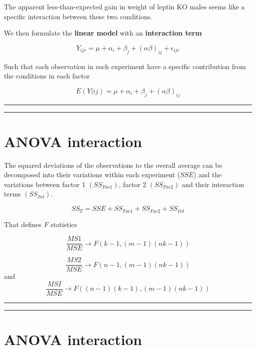 \documentclass[
]{book}
\begin{document}
The apparent less-than-expected gain in weight of leptin KO males seems like a specific interaction between these two conditions.

We then formulate the \textbf{linear model} with an \textbf{interaction term}

\[Y_{ijr} = \mu + \alpha_i + \beta_j + (\alpha\beta)_{ij} + \epsilon_{ijr}\]

Such that each observation in each experiment have a specific contribution from the conditions in each factor

\[E(Y|ij)=\mu + \alpha_i+ \beta_j + (\alpha\beta)_{ij}\]

\begin{center}\rule{0.5\linewidth}{0.5pt}\end{center}

\begin{center}\rule{0.5\linewidth}{0.5pt}\end{center}

\hypertarget{anova-interaction-3}{%
\section{ANOVA interaction}\label{anova-interaction-3}}

The squared deviations of the observations to the overall average can be decomposed into their variations within each experiment (\(SSE\)) and the variations between factor 1 \((SS_{Fac1})\), factor 2 \((SS_{Fac2})\) and their interaction terms \((SS_{Int})\).

\[SS_T= SSE + SS_{Fac1} + SS_{Fac2}+ SS_{Int}\]

That defines \(F\) statistics

\[\frac{MS1}{MSE} \rightarrow F(k-1,(m-1)(nk-1))\]

\[\frac{MS2}{MSE}\rightarrow F(n-1,(m-1)(nk-1))\]
and
\[\frac{MSI}{MSE}\rightarrow F((n-1)(k-1),(m-1)(nk-1))\]

\begin{center}\rule{0.5\linewidth}{0.5pt}\end{center}

\begin{center}\rule{0.5\linewidth}{0.5pt}\end{center}

\hypertarget{anova-interaction-4}{%
\section{ANOVA interaction}\label{anova-interaction-4}}
\end{document}
